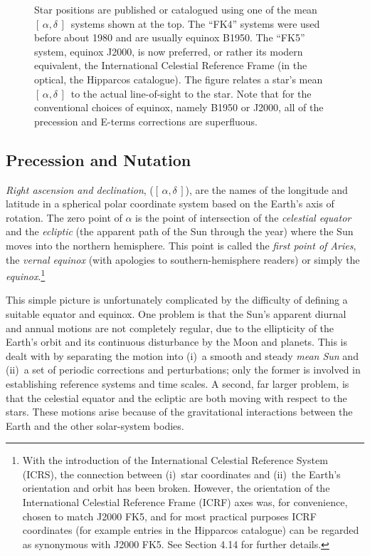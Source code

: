 \documentclass[11pt,twoside]{article}
\newcommand{\radec}     {$[\,\alpha,\delta\,]$}
\begin{document}
\begin{figure}
Star positions are published or catalogued using
one of the mean \radec\ systems shown at
the top.  The ``FK4'' systems
were used before about 1980 and are usually
equinox B1950.  The ``FK5'' system, equinox J2000, is now preferred,
or rather its modern equivalent, the International Celestial Reference
Frame (in the optical, the Hipparcos catalogue).
The figure relates a star's mean \radec\ to the actual
line-of-sight to the star.
Note that for the conventional choices of equinox, namely
B1950 or J2000, all of the precession and E-terms corrections
are superfluous.
\end{figure}

\subsection{Precession and Nutation}
{\it Right ascension and declination}, (\radec), are the names
of the longitude and latitude in a spherical
polar coordinate system based on the Earth's axis of rotation.
The zero point of $\alpha$ is the point of intersection of
the {\it celestial
equator}\/ and the {\it ecliptic}\/ (the apparent path of the Sun
through the year) where the Sun moves into the northern
hemisphere.  This point is called the
{\it first point of Aries},
the {\it vernal equinox}\/ (with apologies to
southern-hemisphere readers) or simply the {\it equinox}.\footnote{With
the introduction of the International Celestial Reference System (ICRS), the
connection between (i)~star coordinates and (ii)~the Earth's orientation
and orbit has been broken.  However, the orientation of the
International Celestial Reference Frame (ICRF) axes was, for convenience,
chosen to match J2000 FK5, and for most practical purposes ICRF coordinates
(for example entries in the Hipparcos catalogue) can be regarded as
synonymous with J2000 FK5.  See Section 4.14 for further details.}

This simple picture is unfortunately
complicated by the difficulty of defining
a suitable equator and equinox.  One problem is that the
Sun's apparent diurnal and annual
motions are not completely regular, due to the
ellipticity of the Earth's orbit and its continuous disturbance
by the Moon and planets.  This is dealt with by
separating the motion into (i)~a smooth and steady {\it mean Sun}\/
and (ii)~a set of periodic corrections and perturbations; only the former
is involved in establishing reference systems and time scales.
A second, far larger problem, is that
the celestial equator and the ecliptic
are both moving with respect to the stars.
These motions arise because of the gravitational
interactions between the Earth and the other solar-system bodies.
\end{document}

